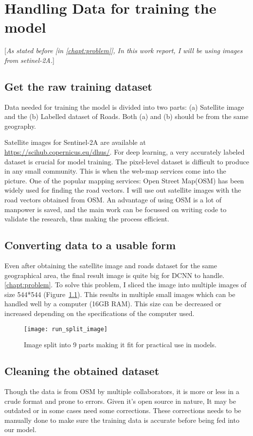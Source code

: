 \chapter{Handling Data for training the model}\label{chapt:data}
[\textit{As stated before [in \ref{chapt:problem}], In this work report, I will be using images from setinel-2A.}]

\section{Get the raw training dataset}
Data needed for training the model is divided into two parts: (a) Satellite image and the (b) Labelled dataset of Roads. Both (a) and (b) should be from the same geography. \par

Satellite images for Sentinel-2A are available at \url{https://scihub.copernicus.eu/dhus/}. For deep learning, a very accurately labeled dataset is crucial for model training. The pixel-level dataset is difficult to produce in any small community. This is when the web-map services come into the picture. One of the popular mapping services: Open Street Map(OSM) has been widely used for finding the road vectors. I will use out satellite images with the road vectors obtained from OSM. An advantage of using OSM is a lot of manpower is saved, and the main work can be focussed on writing code to validate the research, thus making the process efficient.


\section{Converting data to a usable form}
Even after obtaining the satellite image and roads dataset for the same geographical area, the final result image is quite big for DCNN to handle. \ref{chapt:problem}. To solve this problem, I sliced the image into multiple images of size 544*544 (Figure~\ref{fig:run_split_images}). This results in multiple small images which can be handled well by a computer (16GB RAM). This size can be decreased or increased depending on the specifications of the computer used.

\begin{figure}[h!]
  \centering
  \texttt{[image: run\_split\_image]}
  \caption{Image split into 9 parts making it fit for practical use in models.}
  \label{fig:run_split_images}
\end{figure}


\section{Cleaning the obtained dataset}
Though the data is from OSM by multiple collaborators, it is more or less in a crude format and prone to errors. Given it's open source in nature, It may be outdated or in some cases need some corrections. These corrections needs to be manually done to make sure the training data is accurate before being fed into our model. \par

